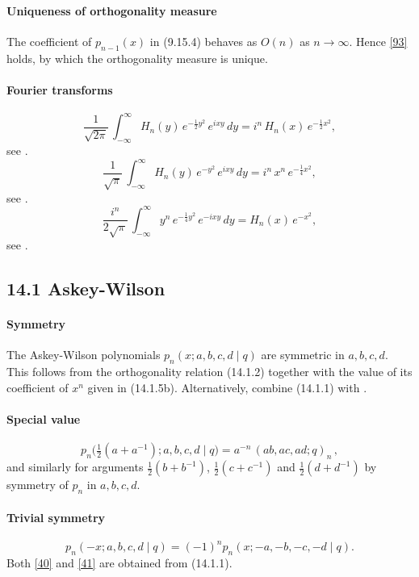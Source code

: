 \documentclass[twoside,11pt]{article}
\newcommand\sa{\smallskipamount}
\newcommand\sLP{\\[\sa]}
\newcommand\half{\frac12}
\newcommand\thalf{\tfrac12}
\newcommand\iy\infty
\begin{document}
\paragraph{Uniqueness of orthogonality measure}
The coefficient of $p_{n-1}(x)$ in (9.15.4) behaves as $O(n)$ as $n\to\iy$.
Hence \eqref{93} holds, by which the orthogonality measure is unique.
%
\paragraph{Fourier transforms}
\begin{equation}
\frac1{\sqrt{2\pi}}\,\int_{-\iy}^\iy H_n(y)\,e^{-\half y^2}\,e^{ixy}\,dy=
i^n\,H_n(x)\,e^{-\half x^2},
\label{15}
\end{equation}
see \cite[(6.1.15) and Exercise 6.11]{AAR}.
\begin{equation}
\frac1{\sqrt\pi}\,\int_{-\iy}^\iy H_n(y)\,e^{-y^2}\,e^{ixy}\,dy=
i^n\,x^n\,e^{-\frac14 x^2},
\label{16}
\end{equation}
see \cite[(18.17.35)]{DLMF}.
\begin{equation}
\frac{i^n}{2\sqrt\pi}\,\int_{-\iy}^\iy y^n\,e^{-\frac14 y^2}\,e^{-ixy}\,dy=
H_n(x)\,e^{-x^2},
\label{17}
\end{equation}
see \cite[(6.1.4)]{AAR}.
%
\subsection*{14.1 Askey-Wilson}
%
\paragraph{Symmetry}
The Askey-Wilson polynomials $p_n(x;a,b,c,d\mid q)$ are symmetric
in $a,b,c,d$.
\sLP
This follows from the orthogonality relation (14.1.2)
together with the value of its coefficient of $x^n$ given in (14.1.5b).
Alternatively, combine (14.1.1) with \cite[(III.15)]{GR}.
%
\paragraph{Special value}
\begin{equation}
p_n\big(\thalf(a+a^{-1});a,b,c,d\mid q\big)=a^{-n}\,(ab,ac,ad;q)_n\,,
\label{40}
\end{equation}
and similarly for arguments $\thalf(b+b^{-1})$, $\thalf(c+c^{-1})$ and
$\thalf(d+d^{-1})$ by symmetry of $p_n$ in $a,b,c,d$.
%
\paragraph{Trivial symmetry}
\begin{equation}
p_n(-x;a,b,c,d\mid q)=(-1)^n p_n(x;-a,-b,-c,-d\mid q).
\label{41}
\end{equation}
Both \eqref{40} and \eqref{41} are obtained from (14.1.1).
%
\end{document}
